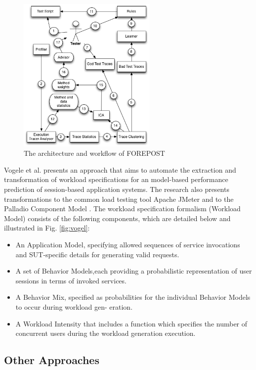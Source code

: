 \documentclass{report}
\begin{document}
\begin{figure}[!ht]
\centering
\includegraphics[width=0.6\textwidth]{./images/FOREPOST.png}
\caption{The architecture and workflow of FOREPOST}
\label{fig:forepost}

\end{figure}

Vogele et al. presents an approach that aims to automate the extraction and transformation of workload specifications for an model-based performance prediction of session-based application systems.  The research also presents transformations to the common load testing tool Apache JMeter and to the Palladio Component Model \cite{Vogele2016}. The workload specification formalism (Workload Model) consists of the following components, which are detailed below and illustrated in Fig. \ref{fig:vogel}:
\begin{itemize}
\item An Application Model, specifying allowed sequences of service invocations and SUT-specific details for generating valid requests.
\item A set of Behavior Models,each providing a probabilistic representation of user sessions in terms of invoked services.
\item A Behavior Mix, specified as probabilities for the individual Behavior Models to occur during workload gen- eration.
\item A Workload Intensity that includes a function which specifies the number of concurrent users during the workload generation execution.
\end{itemize}

\subsection{Other Approaches}
\end{document}
